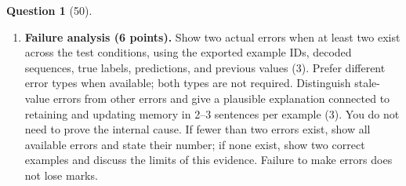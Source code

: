 \documentclass[12pt]{article}
\theoremstyle{definition}
\newtheorem{exercise}{Question}
\begin{document}
\begin{exercise}[50]
{\begin{enumerate}[label=\textbf{1.2.\arabic*}, leftmargin=*]
\item \textbf{Failure analysis (6 points).} Show two actual errors when at least two exist
across the test conditions, using the exported example IDs, decoded
sequences, true labels, predictions, and previous values (3). Prefer different error types when available; both types are not required.
Distinguish stale-value errors from other errors and give a plausible
explanation connected to retaining and updating memory in 2--3 sentences per example (3). You do not need to prove the internal cause.
If fewer than two errors exist, show all available errors and state their
number; if none exist, show two correct examples and discuss the limits of
this evidence. Failure to make errors does not lose marks.
\end{enumerate}
}
\end{exercise}
\end{document}
